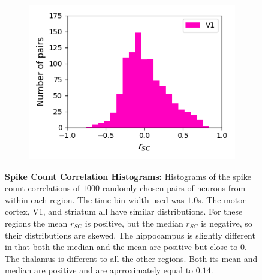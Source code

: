 \documentclass[a4paper,12pt]{article}
\theoremstyle{definition}
\begin{document}
\begin{figure}[p]
\begin{subfigure}{0.5\textwidth}
    \includegraphics[width=\textwidth]{figures/all_v1_8_1p0_correlation_histogram.png}
  \end{subfigure}
  \caption{\textbf{Spike Count Correlation Histograms:} Histograms of the spike count correlations of $1000$ randomly chosen pairs of neurons from within each region. The time bin width used was $1.0$s. The motor cortex, V1, and striatum all have similar distributions. For these regions the mean $r_{SC}$ is positive, but the median $r_{SC}$ is negative, so their distributions are skewed. The hippocampus is slightly different in that both the median and the mean are positive but close to $0$. The thalamus is different to all the other regions. Both its mean and median are positive and are aprroximately equal to $0.14$.}
  \label{fig:all_corr_histograms}
\end{figure}
\end{document}
